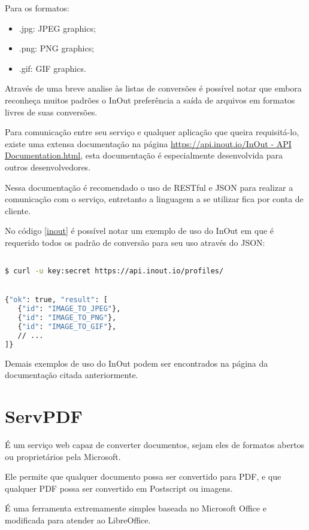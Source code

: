 Para os formatos:
\begin{itemize}
    \item{.jpg: JPEG graphics;}
    \item{.png: PNG graphics;}
    \item{.gif: GIF graphics.}
\end{itemize}

Através de uma breve analise às listas de conversões é possível notar que embora reconheça muitos padrões o InOut preferência a saída de arquivos em formatos livres de suas conversões.

Para comunicação entre seu serviço e qualquer aplicação que queira requisitá-lo, existe uma extensa documentação na página \url{https://api.inout.io/InOut - API Documentation.html}, esta documentação é especialmente desenvolvida para outros desenvolvedores.

Nessa documentação é recomendado o uso de RESTful e JSON para realizar a comunicação com o serviço, entretanto a linguagem a se utilizar fica por conta de cliente.

No código \ref{inout} é possível notar um exemplo de uso do InOut em que é requerido todos os padrão de conversão para seu uso através do JSON:

{\singlespace
\begin{lstlisting}[caption=Requisição de perfis do InOut,language=bash,label={inout}]

$ curl -u key:secret https://api.inout.io/profiles/


{"ok": true, "result": [
   {"id": "IMAGE_TO_JPEG"},
   {"id": "IMAGE_TO_PNG"},
   {"id": "IMAGE_TO_GIF"},
   // ...
]}
\end{lstlisting}
}

Demais exemplos de uso do InOut podem ser encontrados na página da documentação citada anteriormente.


\section{ServPDF}

É um serviço web capaz de converter documentos, sejam eles de formatos abertos ou proprietários pela Microsoft.

Ele permite que qualquer documento possa ser convertido para PDF, e que qualquer PDF possa ser convertido em Postscript ou imagens.

É uma ferramenta extremamente simples baseada no Microsoft Office e modificada para atender ao LibreOffice.


